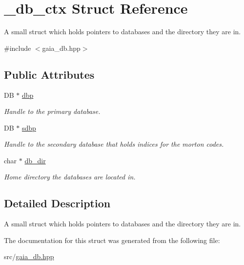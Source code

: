 \hypertarget{struct__db__ctx}{}\section{\+\_\+db\+\_\+ctx Struct Reference}
\label{struct__db__ctx}


A small struct which holds pointers to databases and the directory they are in.  




{\ttfamily \#include $<$gaia\+\_\+db.\+hpp$>$}

\subsection*{Public Attributes}
\begin{DoxyCompactItemize}
\item 
\mbox{\label{struct__db__ctx_a0ff642d9584a191613fa5aa0bf6c1517}} 
DB $\ast$ \mbox{\hyperlink{struct__db__ctx_a0ff642d9584a191613fa5aa0bf6c1517}{dbp}}
\begin{DoxyCompactList}\small\item\em Handle to the primary database. \end{DoxyCompactList}\item 
\mbox{\label{struct__db__ctx_ac2d1ca553302f173bd7d5f7bcf410b17}} 
DB $\ast$ \mbox{\hyperlink{struct__db__ctx_ac2d1ca553302f173bd7d5f7bcf410b17}{sdbp}}
\begin{DoxyCompactList}\small\item\em Handle to the secondary database that holds indices for the morton codes. \end{DoxyCompactList}\item 
\mbox{\label{struct__db__ctx_a05f5aef209afa76ebbf4178abea01263}} 
char $\ast$ \mbox{\hyperlink{struct__db__ctx_a05f5aef209afa76ebbf4178abea01263}{db\+\_\+dir}}
\begin{DoxyCompactList}\small\item\em Home directory the databases are located in. \end{DoxyCompactList}\end{DoxyCompactItemize}


\subsection{Detailed Description}
A small struct which holds pointers to databases and the directory they are in. 

The documentation for this struct was generated from the following file\+:\begin{DoxyCompactItemize}
\item 
src/\mbox{\hyperlink{gaia__db_8hpp}{gaia\+\_\+db.\+hpp}}\end{DoxyCompactItemize}
